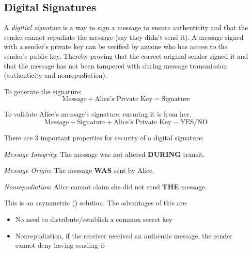 \subsection{Digital Signatures}\label{subsec:Digital_Signatures}
\begin{definition}
  A \emph{digitial signature} is a way to sign a message to ensure authenticity and that the sender cannot repudiate the message (say they didn't send it).
  A message signed with a sender’s private key can be verified by anyone who has access to the sender’s public key.
  Thereby proving that the correct original sender signed it and that the message has not been tampered with during message transmission (authenticity and nonrepudiation).

  To generate the signature:
  \begin{equation}\label{eq:Digital_Signature-Generate}
    \text{Message} + \text{Alice's Private Key} = \text{Signature}
  \end{equation}

  To validate Alice's message's signature, ensuring it is from her,
  \begin{equation}\label{eq:Digital_Signature-Validate}
    \text{Message} + \text{Signature} + \text{Alice's Private Key} = \text{YES/NO}
  \end{equation}

  There are 3 important properties for security of a digital signature:
  \begin{propertylist}
  \item \emph{Message Integrity}: The message was not altered \textbf{DURING} transit.\label{prop:Digital_Signature-Message_Integrity}
  \item \emph{Message Origin}: The message \textbf{WAS} sent by Alice.\label{prop:Digital_Signature-Message_Origin}
  \item \emph{Nonrepudiation}: Alice cannot claim she did not send \textbf{THE} message.\label{prop:Digital_Signature-Nonrepudiation}
  \end{propertylist}
\end{definition}

This is an asymmetric () solution.
The advantages of this are:
\begin{itemize}[noitemsep]
\item No need to distribute/establish a common secret key
\item Nonrepudiation, if the receiver received an authentic message, the sender cannot deny having sending it
\end{itemize}

